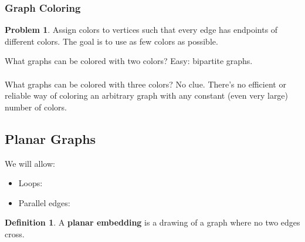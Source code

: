 \documentclass[]{article}
\theoremstyle{definition}
\newtheorem{problem}{Problem}[section]
\newtheorem*{defn}{Definition}
\begin{document}
			\subsubsection{Graph Coloring}
				\begin{problem}
					Assign colors to vertices such that every edge has endpoints of different colors. The goal is to use as few colors as possible.
				\end{problem}

				What graphs can be colored with two colors? Easy: bipartite graphs.
				\\ \\
				What graphs can be colored with three colors? No clue. There's no efficient or reliable way of coloring an arbitrary graph with any constant (even very large) number of colors.

		\subsection{Planar Graphs}
			We will allow:
			\begin{itemize}
				\item Loops:
					\begin{center}
					\end{center}
				\item Parallel edges:
					\begin{center}
					\end{center}
			\end{itemize}

			\begin{defn}
				A \textbf{planar embedding} is a drawing of a graph where no two edges cross.
			\end{defn}
\end{document}
